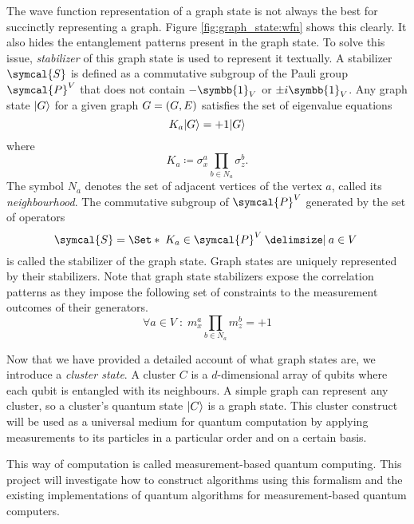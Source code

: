 The wave function representation of a graph state is not always the best for succinctly representing a graph. Figure \ref{fig:graph_state:wfn} shows this clearly. It also hides the entanglement patterns present in the graph state. To solve this issue, \emph{stabilizer} of this graph state is used to represent it textually. A stabilizer \(\symcal{S}\) is defined as a commutative subgroup of the Pauli group \(\symcal{P}^V\) that does not contain \(-\symbb{1}_V\) or \(\pm i\symbb{1}_V\). Any graph state \(\lvert G\rangle\) for a given graph \(G = (G, E)\) satisfies the set of eigenvalue equations 
\begin{equation}
  K_a\lvert G\rangle = +1 \lvert G\rangle
\end{equation}
where
\begin{equation}
  K_a \coloneq  \sigma_x^a \prod_{b\in N_a} \sigma_z^b.
\end{equation} The symbol \(N_a\) denotes the set of adjacent vertices of the vertex \(a\), called its \emph{neighbourhood}. The commutative subgroup of \(\symcal{P}^V\) generated by the set of operators 
\begin{equation}
  \symcal{S} = \Set*{\;K_a \in \symcal{P}^V \given a \in V \; }
\end{equation}
is called the stabilizer of the graph state. Graph states are uniquely represented by their stabilizers. Note that graph state stabilizers expose the correlation patterns as they impose the following set of constraints to the measurement outcomes of their generators.
\begin{equation}
  \forall a\in V \; : \; m_x^a \prod_{b\in N_a} m_z^b = +1 
\end{equation} 

Now that we have provided a detailed account of what graph states are, we introduce a \emph{cluster state}. A cluster \(C\) is a \(d\)-dimensional array of qubits where each qubit is entangled with its neighbours. A simple graph can represent any cluster, so a cluster's quantum state \(\lvert C\rangle\) is a graph state. This cluster construct will be used as a universal medium for quantum computation by applying measurements to its particles in a particular order and on a certain basis\cite{russendorf2001}.

This way of computation is called measurement-based quantum computing. This project will investigate how to construct algorithms using this formalism and the existing implementations of quantum algorithms for measurement-based quantum computers.